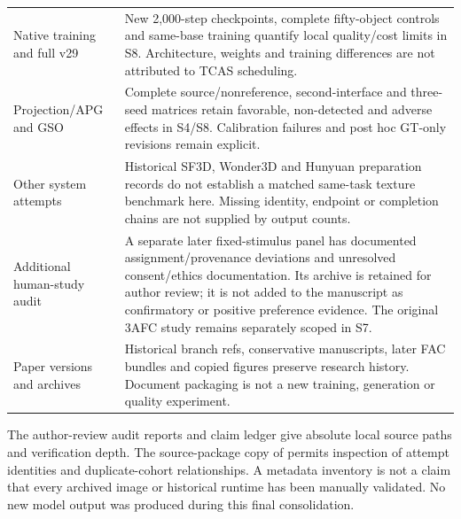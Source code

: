 \documentclass[11pt]{article}
\begin{document}
\begin{longtable}{p{3.3cm}p{10.3cm}}
Native training and full v29 & New 2,000-step checkpoints, complete fifty-object controls and same-base training quantify local quality/cost limits in S8. Architecture, weights and training differences are not attributed to TCAS scheduling. \\
Projection/APG and GSO & Complete source/nonreference, second-interface and three-seed matrices retain favorable, non-detected and adverse effects in S4/S8. Calibration failures and post hoc GT-only revisions remain explicit. \\
Other system attempts & Historical SF3D, Wonder3D and Hunyuan preparation records do not establish a matched same-task texture benchmark here. Missing identity, endpoint or completion chains are not supplied by output counts. \\
Additional human-study audit & A separate later fixed-stimulus panel has documented assignment/provenance deviations and unresolved consent/ethics documentation. Its archive is retained for author review; it is not added to the manuscript as confirmatory or positive preference evidence. The original 3AFC study remains separately scoped in S7. \\
Paper versions and archives & Historical branch refs, conservative manuscripts, later FAC bundles and copied figures preserve research history. Document packaging is not a new training, generation or quality experiment. \\
\bottomrule
\end{longtable}\endgroup
The author-review audit reports and claim ledger give absolute local source paths and verification depth. The source-package copy of  permits inspection of attempt identities and duplicate-cohort relationships. A metadata inventory is not a claim that every archived image or historical runtime has been manually validated. No new model output was produced during this final consolidation.
\end{document}
